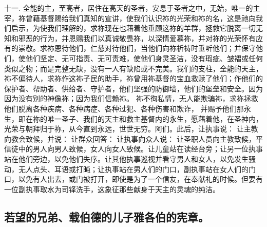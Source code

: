 十一. 全能的主，至高者，居住在高天的圣者，安息于圣者之中，无始，唯一的主宰，祢曾藉基督赐给我们真知的宣讲，使我们认识祢的光荣和祢的名，这是祂向我们启示，为使我们理解的，求祢现在也藉着他垂顾这祢的羊群，拯救它脱离一切无知和邪恶的行为，并恩赐我们以真诚敬畏祢，以深情爱慕祢，并对祢的光荣怀有应有的崇敬。求祢恩待他们，仁慈对待他们，当他们向祢祈祷时垂听他们；并保守他们，使他们坚定、无可指责、无可责难，使他们身灵圣洁，没有瑕疵、皱褶或任何类似之物；而是完整无缺，没有一人有缺陷或不完美。我们的支柱，全能的天主，祢不偏待人，求祢作这祢子民的助手，祢曾用祢基督的宝血救赎了他们；作他们的保护者、帮助者、供给者、守护者，他们坚强的防御墙，他们的堡垒和安全。因为  因为没有别的神像祢；因为我们信赖祢。  祢不徇私情，无人能欺骗祢，求祢拯救他们脱离各种疾病、各种病症、各种过犯、各种伤害和欺诈， 并赐予他们那永生，即在祢的唯一圣子、我们的天主和救主基督内的永生，愿藉着他，在圣神内，光荣与朝拜归于祢，从今直到永远，世世无穷。阿们。此后，让执事说： 让主教向教会致候，并说： 让群众回答： 让执事向众人说： 让圣职人员向主教致候，平信徒中的男人向男人致候，女人向女人致候。让儿童站在读经台旁；让另一位执事站在他们旁边，以免他们失序。让其他执事巡视并看守男人和女人，以免发生骚动，无人点头、耳语或打盹；让执事站在男人们的门口，副执事站在女人们的门口，以免有人出去，或门被打开，即使是为了一个信友，在奉献礼的时候。但要有一位副执事取水为司铎洗手，这象征那些献身于天主的灵魂的纯洁。\par


\subsection{若望的兄弟、载伯德的儿子雅各伯的宪章。}


